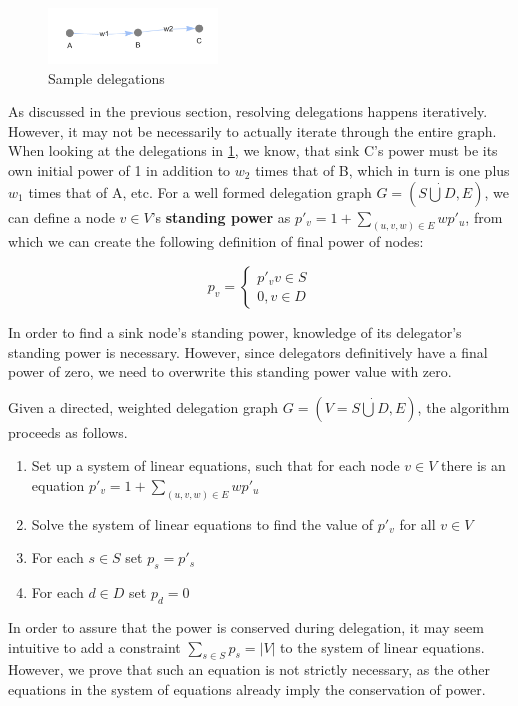 \begin{figure}[h]
	\centering
	\includegraphics[width=0.4\textwidth]{delegation_graph_sample}
	\caption{Sample delegations}
	\label{fig:sample_delegations}
\end{figure}

As discussed in the previous section, resolving delegations happens iteratively. However, it may not be necessarily to actually iterate through the entire graph. When looking at the delegations in \cref{fig:sample_delegations}, we know, that sink C's power must be its own initial power of 1 in addition to $w_2$ times that of B, which in turn is one plus $w_1$ times that of A, etc. For a well formed delegation graph $G=(S\dot\bigcup D, E)$, we can define a node $v \in V$'s \textbf{standing power} as $p'_v = 1 + \sum_{(u, v, w) \in E} wp'_u$, from which we can create the following definition of final power of nodes:

\[
p_v = 
\begin{cases}
 p'_v v \in S \\ 
 0, v \in D 
 \end{cases}
\]

In order to find a sink node's standing power, knowledge of its delegator's standing power is necessary. However, since delegators definitively have a final power of zero, we need to overwrite this standing power value with zero.  

Given a directed, weighted delegation graph $G = (V = S \dot\bigcup D, E)$, the algorithm proceeds as follows.

\begin{enumerate}
\item Set up a system of linear equations, such that for each node $v \in V$ there is an equation $p'_v = 1+\sum_{(u, v, w) \in E}wp'_u$
\item Solve the system of linear equations to find the value of $p'_v$ for all $v \in V$
\item For each $s \in S$ set $p_s = p'_s$
\item For each $d \in D$ set $p_d = 0$
\end{enumerate}

In order to assure that the power is conserved during delegation, it may seem intuitive to add a constraint $\sum_{s \in S} p_s = |V|$ to the system of linear equations. However, we prove that such an equation is not strictly necessary, as the other equations in the system of equations already imply the conservation of power.

